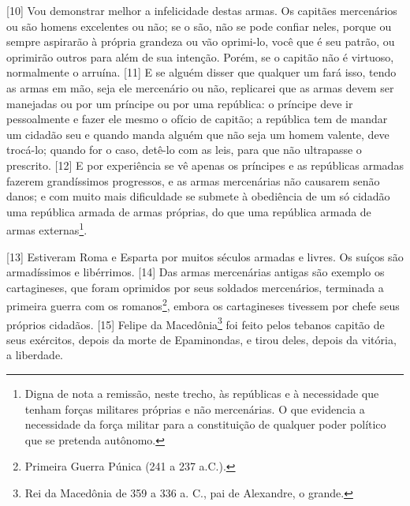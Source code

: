 {[}10{]} Vou demonstrar melhor a infelicidade destas armas. Os capitães
mercenários ou são homens excelentes ou não; se o são, não se pode
confiar neles, porque ou sempre aspirarão à própria grandeza ou vão
oprimi-lo, você que é seu patrão, ou oprimirão outros para além de sua
intenção. Porém, se o capitão não é virtuoso, normalmente o arruína.
{[}11{]} E se alguém disser que qualquer um fará isso, tendo as armas em
mão, seja ele mercenário ou não, replicarei que as armas devem ser
manejadas ou por um príncipe ou por uma república: o príncipe deve ir
pessoalmente e fazer ele mesmo o ofício de capitão; a república tem de
mandar um cidadão seu e quando manda alguém que não seja um homem
valente, deve trocá-lo; quando for o caso, detê-lo com as leis, para que
não ultrapasse o prescrito. {[}12{]} E por experiência se vê apenas os
príncipes e as repúblicas armadas fazerem grandíssimos progressos, e as
armas mercenárias não causarem senão danos; e com muito mais dificuldade
se submete à obediência de um só cidadão uma república armada de armas
próprias, do que uma república armada de armas externas\footnote{Digna
  de nota a remissão, neste trecho, às repúblicas e à necessidade que
  tenham forças militares próprias e não mercenárias. O que evidencia a
  necessidade da força militar para a constituição de qualquer poder
  político que se pretenda autônomo.}.

{[}13{]} Estiveram Roma e Esparta por muitos séculos armadas e livres.
Os suíços são armadíssimos e libérrimos. {[}14{]} Das armas mercenárias
antigas são exemplo os cartagineses, que foram oprimidos por seus
soldados mercenários, terminada a primeira guerra com os
romanos\footnote{Primeira Guerra Púnica (241 a 237 a.C.).}, embora os
cartagineses tivessem por chefe seus próprios cidadãos. {[}15{]} Felipe
da Macedônia\footnote{Rei da Macedônia de 359 a 336 a. C., pai de
  Alexandre, o grande.} foi feito pelos tebanos capitão de seus
exércitos, depois da morte de Epaminondas, e tirou deles, depois da
vitória, a liberdade.

